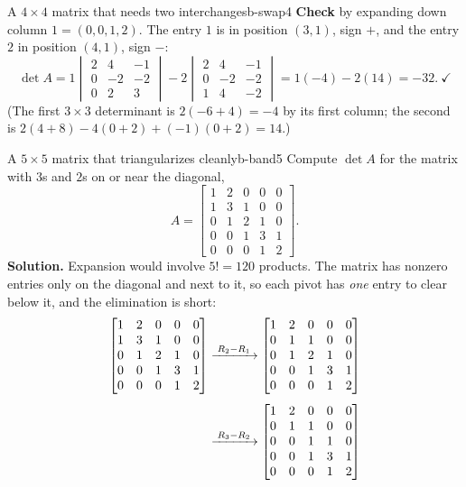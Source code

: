 \documentclass[11pt]{article}
\begin{document}
\begin{exmp}{A $4\times4$ matrix that needs two interchanges}{b-swap4}
\textbf{Check} by expanding down column $1=(0,0,1,2)$. The entry $1$ is in position $(3,1)$, sign $+$, and the entry $2$ in position $(4,1)$, sign $-$:
\[
\det A=1\begin{vmatrix}2&4&-1\\0&-2&-2\\0&2&3\end{vmatrix}-2\begin{vmatrix}2&4&-1\\0&-2&-2\\1&4&-2\end{vmatrix}=1(-4)-2(14)=-32.\ \checkmark
\]
(The first $3\times3$ determinant is $2(-6+4)=-4$ by its first column; the second is $2(4+8)-4(0+2)+(-1)(0+2)=14$.)
\end{exmp}

\begin{exmp}{A $5\times5$ matrix that triangularizes cleanly}{b-band5}
Compute $\det A$ for the matrix with $3$s and $2$s on or near the diagonal,
\[
A=\begin{bmatrix}1&2&0&0&0\\1&3&1&0&0\\0&1&2&1&0\\0&0&1&3&1\\0&0&0&1&2\end{bmatrix}.
\]
\textbf{Solution.} Expansion would involve $5!=120$ products. The matrix has nonzero entries only on the diagonal and next to it, so each pivot has \emph{one} entry to clear below it, and the elimination is short:
\begin{align*}
\begin{bmatrix}1&2&0&0&0\\1&3&1&0&0\\0&1&2&1&0\\0&0&1&3&1\\0&0&0&1&2\end{bmatrix}
&\rops{R_2-R_1}
\begin{bmatrix}1&2&0&0&0\\0&1&1&0&0\\0&1&2&1&0\\0&0&1&3&1\\0&0&0&1&2\end{bmatrix}
\\[4pt]
&\rops{R_3-R_2}
\begin{bmatrix}1&2&0&0&0\\0&1&1&0&0\\0&0&1&1&0\\0&0&1&3&1\\0&0&0&1&2\end{bmatrix}

\end{align*}
\end{exmp}
\end{document}

